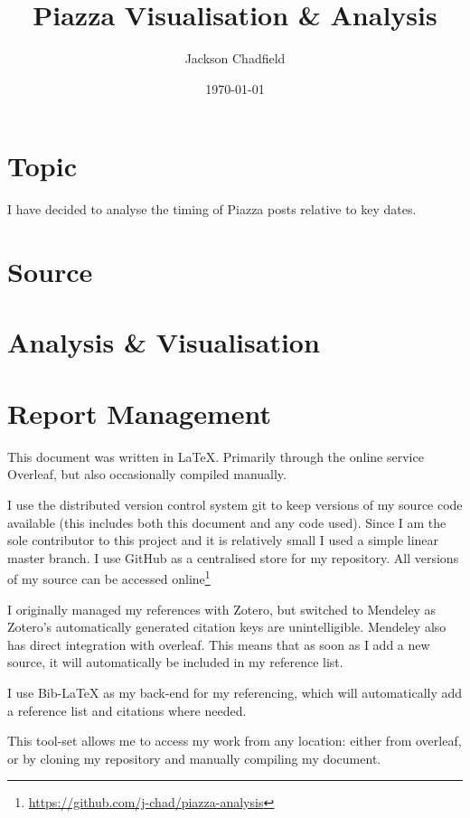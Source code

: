 \documentclass{scrartcl}
\title{Piazza Visualisation \& Analysis}
\author{Jackson Chadfield}
\date{\today}
\begin{document}
\maketitle

\section{Topic}
I have decided to analyse the timing of Piazza posts relative to key dates.

\section{Source}

\section{Analysis \& Visualisation}

\section{Report Management}
This document was written in \LaTeX. Primarily through the online service Overleaf, but also occasionally compiled manually.

I use the distributed version control system git to keep versions of my source code available (this includes both this document and any code used). Since I am the sole contributor to this project and it is relatively small I used a simple linear master branch. I use GitHub as a centralised store for my repository. All versions of my source can be accessed online\footnote{\url{https://github.com/j-chad/piazza-analysis}}

I originally managed my references with Zotero, but switched to Mendeley as Zotero's automatically generated citation keys are unintelligible. Mendeley also has direct integration with overleaf. This means that as soon as I add a new source, it will automatically be included in my reference list. 

I use Bib-\LaTeX{} as my back-end for my referencing, which will automatically add a reference list and citations where needed.

This tool-set allows me to access my work from any location: either from overleaf, or by cloning my repository and manually compiling my document.
\end{document}
